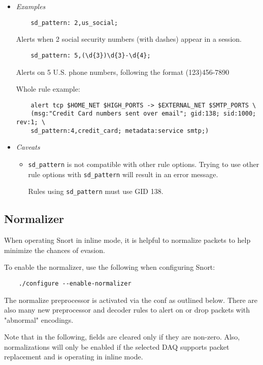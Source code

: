 \documentclass[english]{report}
\begin{document}
\begin{itemize}
\item[] \textit{Examples}
\begin{verbatim}
    sd_pattern: 2,us_social;
\end{verbatim}
    Alerts when 2 social security numbers (with dashes) appear in a session.

\begin{verbatim}
    sd_pattern: 5,(\d{3})\d{3}-\d{4};
\end{verbatim}
    Alerts on 5 U.S. phone numbers, following the format (123)456-7890

    Whole rule example:

\begin{verbatim}
    alert tcp $HOME_NET $HIGH_PORTS -> $EXTERNAL_NET $SMTP_PORTS \
    (msg:"Credit Card numbers sent over email"; gid:138; sid:1000; rev:1; \
    sd_pattern:4,credit_card; metadata:service smtp;)
\end{verbatim}


\item[] \textit{Caveats}
\begin{itemize}
\item[] \texttt{sd\_pattern} is not compatible with other rule options. Trying to use
other rule options with \texttt{sd\_pattern} will result in an error message.

Rules using \texttt{sd\_pattern} must use GID 138.
\end{itemize}
\end{itemize}

\subsection{Normalizer}

When operating Snort in inline mode, it is helpful to normalize packets to help
minimize the chances of evasion.

To enable the normalizer, use the following when configuring Snort:

\begin{verbatim}
    ./configure --enable-normalizer
\end{verbatim}

The normalize preprocessor is activated via the conf as outlined below.  There
are also many new preprocessor and decoder rules to alert on or drop packets
with "abnormal" encodings.

Note that in the following, fields are cleared only if they are non-zero.
Also, normalizations will only be enabled if the selected DAQ supports packet
replacement and is operating in inline mode.
\end{document}
